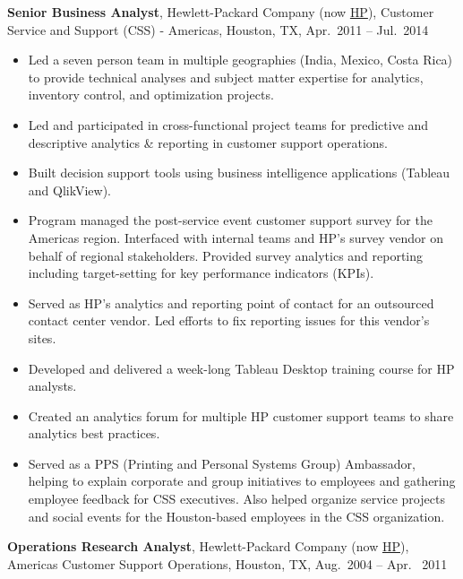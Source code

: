 \documentclass[
]{article}
\providecommand{\tightlist}{%
  \setlength{\itemsep}{0pt}\setlength{\parskip}{0pt}}
\begin{document}
\textbf{Senior Business Analyst}, Hewlett-Packard Company (now
\href{https://www.hp.com/}{HP}), Customer Service and Support (CSS) -
Americas, Houston, TX, Apr.~2011 -- Jul.~2014

\begin{itemize}
\tightlist
\item
  Led a seven person team in multiple geographies (India, Mexico, Costa
  Rica) to provide technical analyses and subject matter expertise for
  analytics, inventory control, and optimization projects.
\item
  Led and participated in cross-functional project teams for predictive
  and descriptive analytics \& reporting in customer support operations.
\item
  Built decision support tools using business intelligence applications
  (Tableau and QlikView).
\item
  Program managed the post-service event customer support survey for the
  Americas region. Interfaced with internal teams and HP's survey vendor
  on behalf of regional stakeholders. Provided survey analytics and
  reporting including target-setting for key performance indicators
  (KPIs).
\item
  Served as HP's analytics and reporting point of contact for an
  outsourced contact center vendor. Led efforts to fix reporting issues
  for this vendor's sites.
\item
  Developed and delivered a week-long Tableau Desktop training course
  for HP analysts.
\item
  Created an analytics forum for multiple HP customer support teams to
  share analytics best practices.
\item
  Served as a PPS (Printing and Personal Systems Group) Ambassador,
  helping to explain corporate and group initiatives to employees and
  gathering employee feedback for CSS executives. Also helped organize
  service projects and social events for the Houston-based employees in
  the CSS organization.
\end{itemize}

\textbf{Operations Research Analyst}, Hewlett-Packard Company (now
\href{https://www.hp.com/}{HP}), Americas Customer Support Operations,
Houston, TX, Aug.~2004 -- Apr.~ 2011
\end{document}
